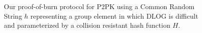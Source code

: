 \begin{figure}[t]
\begin{algorithm}[H]
    \caption{\label{alg.construction-crs} Our proof-of-burn protocol for P2PK
    using a Common Random String $h$ representing
    a group element in which DLOG is difficult and parameterized by
    a collision resistant hash function $H$.}
    \begin{algorithmic}[1]
            \State{}
        \EndFunction
            \State{}
        \EndFunction
        \vskip8pt
    \end{algorithmic}
\end{algorithm}
\end{figure}
